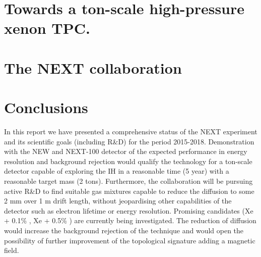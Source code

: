 \documentclass[a4paper, 11pt]{article}
\begin{document}
\section{Towards a ton-scale high-pressure xenon TPC.}
\label{sec.ts}


\section{The NEXT collaboration}
\label{sec.nc}
 

 \section{Conclusions}
 \label{sec.conclu}
 In this report we have presented a comprehensive status of the NEXT experiment and its  scientific goals (including R\&D) for the period 2015-2018. Demonstration with the NEW and NEXT-100 detector of the expected performance in energy resolution and background rejection would qualify the technology for a ton-scale detector capable of exploring the IH in a reasonable time (5 year) with a reasonable target mass (2 tons). Furthermore, the collaboration will be pursuing active R\&D to find suitable gas mixtures capable to reduce the diffusion to some 2 mm over 1 m drift length, without jeopardising other capabilities of the detector such as electron lifetime or energy resolution. Promising candidates (Xe + 0.1\% \COT, Xe + 0.5\% \CHF) are currently being investigated. The reduction of diffusion would increase the background rejection of the technique and would open the possibility of further improvement of the topological signature adding a magnetic field. 
 
 
 \nocite{*}


\end{document}
